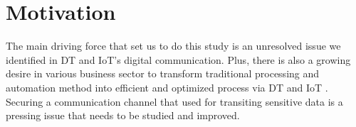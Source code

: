 \section{Motivation}

The main driving force that set us to do this study is an unresolved issue we identified in DT and IoT's digital communication.
Plus, there is also a growing desire in various business sector to transform traditional processing and automation method into efficient and optimized process via DT and IoT \cite{atalay_digital_2022}. Securing a communication channel that used for transiting sensitive data is a pressing issue that needs to be studied and improved. 
